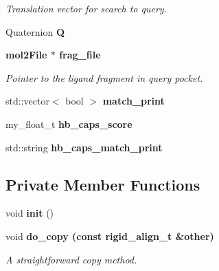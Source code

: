 \begin{CompactItemize}
\begin{CompactList}\small\item\em Translation vector for search to query. \item\end{CompactList}\item 
Quaternion \textbf{Q}\label{classASCbase_1_1rigid__align__t_ffd3c5b8182230bf24cc1ae954039360}

\item 
\bf{mol2File} $\ast$ \bf{frag\_\-file}\label{classASCbase_1_1rigid__align__t_be34b21f5d3ef687d3e9213aca149eb6}

\begin{CompactList}\small\item\em Pointer to the ligand fragment in query pocket. \item\end{CompactList}\item 
std::vector$<$ bool $>$ \textbf{match\_\-print}\label{classASCbase_1_1rigid__align__t_21450c7e527409561c1eaee7f46bf922}

\item 
my\_\-float\_\-t \textbf{hb\_\-caps\_\-score}\label{classASCbase_1_1rigid__align__t_956a632cdccaa9096759d9c1d38c6026}

\item 
std::string \textbf{hb\_\-caps\_\-match\_\-print}\label{classASCbase_1_1rigid__align__t_bd736c82ab7b0c5704c58fd85ca836a1}

\end{CompactItemize}
\subsection*{Private Member Functions}
\begin{CompactItemize}
\item 
void \textbf{init} ()\label{classASCbase_1_1rigid__align__t_19b9ab1fc878784b26ed6bf7a5d2338f}

\item 
void \bf{do\_\-copy} (const \bf{rigid\_\-align\_\-t} \&other)\label{classASCbase_1_1rigid__align__t_ab8efcf8e3820a7e91cd135acef58c84}

\begin{CompactList}\small\item\em A straightforward copy method. \item\end{CompactList}\end{CompactItemize}


